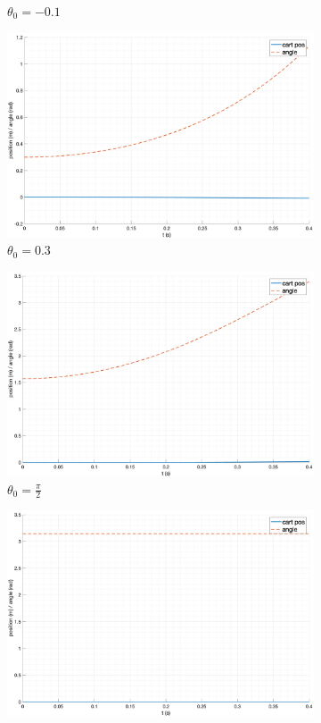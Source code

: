 \begin{figure}[ht!]
\begin{subfigure}[b]{0.45\textwidth}
        \caption{$\theta_0 = -0.1$}
    \end{subfigure}
    \begin{subfigure}[b]{0.45\textwidth}
        \includegraphics[width=\textwidth]{media/plots/free_motion/nonlin_4.png}
        \caption{$\theta_0 = 0.3$}
    \end{subfigure}
    \begin{subfigure}[b]{0.45\textwidth}
        \includegraphics[width=\textwidth]{media/plots/free_motion/nonlin_5.png}
        \caption{$\theta_0 = \frac{\pi}{2}$}
    \end{subfigure}
    \begin{subfigure}[b]{0.45\textwidth}
        \includegraphics[width=\textwidth]{media/plots/free_motion/nonlin_6.png}

\end{subfigure}
\end{figure}

